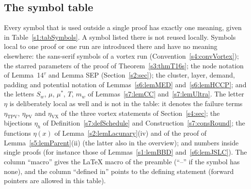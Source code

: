 \subsection{The symbol table}\label{s1:ssecSymbols}

Every symbol that is used outside a single proof has exactly one meaning, given in
Table~\ref{s1:tabSymbols}. A symbol listed there is not reused locally. Symbols
local to one proof or one run are introduced there and have no meaning elsewhere:
the sans-serif symbols of a vortex run (Convention~\ref{s4:convVortex}); the
starred parameters of the proof of Theorem~\ref{s3:thmT16s}; the node notation of
Lemma~14$^\tau$ and Lemma SEP (Section~\ref{s2:sec}); the cluster, layer,
demand, padding and potential notation of Lemmas~\ref{s6:lemMED}
and~\ref{s6:lemHCCP}; and the letters $S_w$, $\mu$, $\mu^*$, $T$, $m_w$ of
Lemmas~\ref{s7:lemCC} and~\ref{s7:lemUltra}. The letter $\eta$ is deliberately
local as well and is not in the table: it denotes the failure terms
$\eta_{\mathrm{TPV}}$, $\eta_{\mathrm{PV}}$ and $\eta_{\mathrm{VX}}$ of the three
vortex statements of Section~\ref{s4:sec}; the bijections $\eta_h$ of
Definition~\ref{s7:defSchedule} and Construction~\ref{s7:consRound}; the
functions $\eta(x)$ of Lemma~\ref{s2:lemLacunary}(iv) and of the proof of
Lemma~\ref{s5:lemParent}(ii) (the latter also in the overview); and numbers
inside single proofs (for instance those of Lemmas~\ref{s1:lemBBD}
and~\ref{s6:lemJSLC}). The column ``macro'' gives the
\LaTeX{} macro of the preamble (``--'' if the symbol has none), and the column
``defined in'' points to the defining statement (forward pointers are allowed in
this table).

